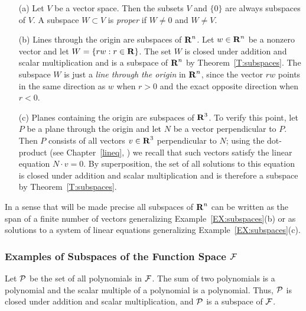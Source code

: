 \documentclass{ximera}
\begin{document}
\begin{exam}  \label{EX:subspaces}
{\rm
\begin{itemize}
\item[(a)] Let $V$ be a vector space.  Then the subsets $V$ and $\{0\}$ are
always subspaces of $V$.  A subspace $W\subset V$ is {\em proper\/} if
$W\neq 0$ and $W\neq V$. 
\item[(b)] Lines through the origin are subspaces of $\mbox{$\bf{R}$}^n$.  Let $w\in \mbox{$\bf{R}$}^n$
be a nonzero vector and let $W=\{rw:r\in\mbox{$\bf{R}$}\}$.  The set $W$ is closed under
addition and scalar multiplication and is a subspace of $\mbox{$\bf{R}$}^n$ by 
Theorem~\ref{T:subspaces}.
The subspace $W$ is just a {\em line through the origin\/} in $\mbox{$\bf{R}$}^n$, since
the vector $rw$ points in the same direction as $w$ when $r>0$ and the exact
opposite direction when $r<0$.
\item[(c)]  Planes containing the origin are subspaces of $\mbox{$\bf{R}$}^3$.  To verify
this point, let $P$ be a plane through the origin and let $N$ be a vector
perpendicular to $P$.  Then $P$ consists of all vectors
$v\in\mbox{$\bf{R}$}^3$ perpendicular to $N$; using the dot-product (see Chapter~\ref{lineq},
) we recall that such vectors satisfy the linear equation
$N\cdot v = 0$.  By superposition, the set of all
solutions to this equation is closed under addition and scalar multiplication
and is therefore a subspace by Theorem~\ref{T:subspaces}.
\end{itemize}
}
\end{exam}
In a sense that will be made precise all subspaces of $\mbox{$\bf{R}$}^n$ can be written
as the span of a finite number of vectors generalizing
Example~\ref{EX:subspaces}(b) or as solutions to a system of linear equations
generalizing Example~\ref{EX:subspaces}(c).


\subsubsection*{Examples of Subspaces of the Function Space ${\cal F}$}

Let ${\cal P}$ be the set of all polynomials in ${\cal F}$.  The sum of
two polynomials is a polynomial and the scalar multiple of a polynomial is a
polynomial.  Thus, ${\cal P}$ is closed under addition and scalar
multiplication, and ${\cal P}$ is a subspace of ${\cal F}$.
\end{document}
